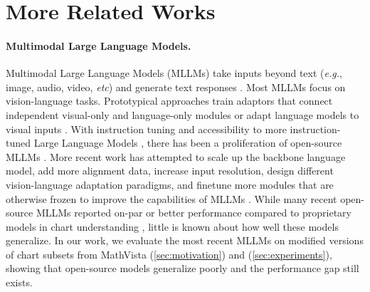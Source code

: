 \newpage
\section{More Related Works}
\label{sec:more_related_works}
\paragraph{Multimodal Large Language Models. } Multimodal Large Language Models (MLLMs) take inputs beyond text (\textit{e.g.}, image, audio, video, \textit{etc}) and generate text responses \cite{huang2023language}. Most MLLMs focus on vision-language tasks. Prototypical approaches train adaptors that connect independent visual-only and language-only modules \cite{li2022blip, li2023blip, alayrac2022flamingo} or adapt language models to visual inputs \cite{huang2023language, chen2022pali, chen2023pali}. With instruction tuning \cite{wei2021finetuned} and accessibility to more instruction-tuned Large Language Models \cite{touvron2023llama, jiang2023mistral, young2024yi, vicuna2023}, there has been a proliferation of open-source MLLMs \cite{liu2023llava, zhang2023llama, zhu2023minigpt, ye2023mplug, dai2023instructblip, li2023mimic, laurençon2023obelics, lin2023sphinx, fuyu-8b}. More recent work has attempted to scale up the backbone language model, add more alignment data, increase input resolution, design different vision-language adaptation paradigms, and finetune more modules that are otherwise frozen to improve the capabilities of MLLMs \cite{liu2023improvedllava, liu2024llavanext, chen2023internvl, dong2024internlmxcomposer24khd, li2024minigemini, chen2024far, laurenccon2024matters, gao2024sphinxx, lee2024moai, lu2024deepseekvl}. While many recent open-source MLLMs reported on-par or better performance compared to proprietary models in chart understanding \cite{lu2024mathvista, masry2022chartqa}, little is known about how well these models generalize. In our work, we evaluate the most recent MLLMs on modified versions of chart subsets from MathVista \cite{lu2024mathvista} (\cref{sec:motivation}) and \ours{} (\cref{sec:experiments}), showing that open-source models generalize poorly and the performance gap still exists.


